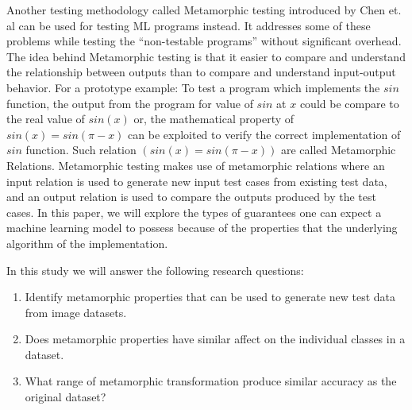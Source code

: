 Another testing methodology called Metamorphic testing introduced by Chen et. al can be used for testing ML programs instead. It addresses some of these problems while testing the \enquote{non-testable programs} without significant overhead. The idea behind Metamorphic testing is that it easier to compare and understand the relationship between outputs than to compare and understand input-output behavior. For a prototype example: To test a program which implements the $sin$ function, the output from the program for value of $sin$ at $x$ could be compare to the real value of $sin(x)$ or, the mathematical property of $sin(x) = sin(\pi-x)$ can be exploited to verify the correct implementation of $sin$ function. Such relation $(sin(x) = sin(\pi-x))$ are called Metamorphic Relations. Metamorphic testing makes use of metamorphic relations where an input relation is used to generate new input test cases from existing test data, and an output relation is used to compare the outputs produced by the test cases.\newline
In this paper, we will explore the types of guarantees one can expect a machine learning model to possess because of the properties that the underlying algorithm of the implementation.


In this study we will answer the following research questions:
\begin{enumerate}
    \item Identify metamorphic properties that can be used to generate new test data from image datasets.
    \item Does metamorphic properties have similar affect on the individual classes in a dataset.
    \item What range of metamorphic transformation produce similar accuracy as the original dataset?

  
\end{enumerate}
%
